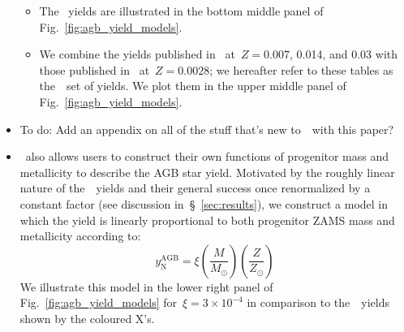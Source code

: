 \documentclass[ms.tex]{subfiles}
\begin{document}
\begin{itemize}
\begin{itemize}
		\item The~\citet[][hereafter~\ventura]{Ventura2013} yields are 
		illustrated in the bottom middle panel of 
		Fig.~\ref{fig:agb_yield_models}. 

		\item We combine the yields published in~\citet{Karakas2016} 
		at~$Z = 0.007$, 0.014, and 0.03 with those published 
		in~\citet{Karakas2018} at~$Z = 0.0028$; we hereafter refer to these 
		tables as the~\karakas~set of yields. 
		We plot them in the upper middle panel of 
		Fig.~\ref{fig:agb_yield_models}. 
	\end{itemize} 

	\item {\color{red} To do: Add an appendix on all of the stuff that's new 
	to~\vice~with this paper?} 

	\item \vice~also allows users to construct their own functions of 
	progenitor mass and metallicity to describe the AGB star yield. 
	Motivated by the roughly linear nature of the~\cristallo~yields and their 
	general success once renormalized by a constant factor (see discussion 
	in~\S~\ref{sec:results}), we construct a model in which the yield is 
	linearly proportional to both progenitor ZAMS mass and metallicity 
	according to: 
	\begin{equation} 
	y_\text{N}^\text{AGB} = \xi\left(\frac{M}{M_\odot}\right) 
	\left(\frac{Z}{Z_\odot}\right) 
	\label{eq:linear_yield} 
	\end{equation} 
	We illustrate this model in the lower right panel of 
	Fig.~\ref{fig:agb_yield_models} for~$\xi = 3\times10^{-4}$ in comparison to 
	the~\cristallo~yields shown by the coloured X's. 
\end{itemize}
\end{document}
